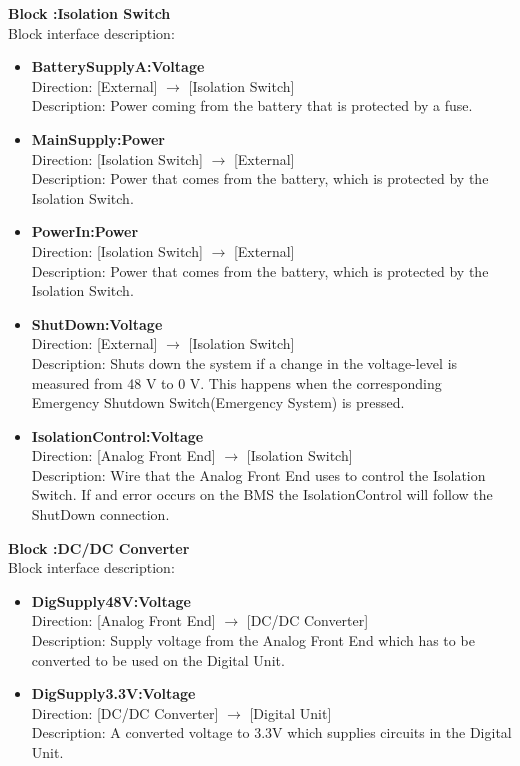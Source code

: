 \textbf{Block :Isolation Switch}\\
Block interface description:
\begin{itemize}
	\item \textbf{BatterySupplyA:Voltage}\\
	Direction: [External] $\rightarrow$ [Isolation Switch]\\
	Description: Power coming from the battery that is protected by a fuse.
	\item \textbf{MainSupply:Power}\\
	Direction: [Isolation Switch] $\rightarrow$ [External]\\
	Description: Power that comes from the battery, which is protected by the Isolation Switch.
	\item \textbf{PowerIn:Power}\\
	Direction: [Isolation Switch] $\rightarrow$ [External]\\
	Description: Power that comes from the battery, which is protected by the Isolation Switch.
	\item \textbf{ShutDown:Voltage}\\
	Direction: [External] $\rightarrow$ [Isolation Switch]\\
	Description: Shuts down the system if a change in the voltage-level is measured from 48 V to 0 V. This happens when the corresponding Emergency Shutdown Switch(Emergency System) is pressed.
	\item \textbf{IsolationControl:Voltage}\\
	Direction: [Analog Front End] $\rightarrow$ [Isolation Switch]\\
	Description: Wire that the Analog Front End uses to control the Isolation Switch. If and error occurs on the BMS the IsolationControl will follow the ShutDown connection.  
\end{itemize}

\textbf{Block :DC/DC Converter}\\
Block interface description:
\begin{itemize}
	\item \textbf{DigSupply48V:Voltage}\\
	Direction: [Analog Front End] $\rightarrow$ [DC/DC Converter]\\
	Description: Supply voltage from the Analog Front End which has to be converted to be used on the Digital Unit.
	\item \textbf{DigSupply3.3V:Voltage}\\
	Direction: [DC/DC Converter] $\rightarrow$ [Digital Unit]\\
	Description: A converted voltage to 3.3V which supplies circuits in the Digital Unit. 
\end{itemize}

